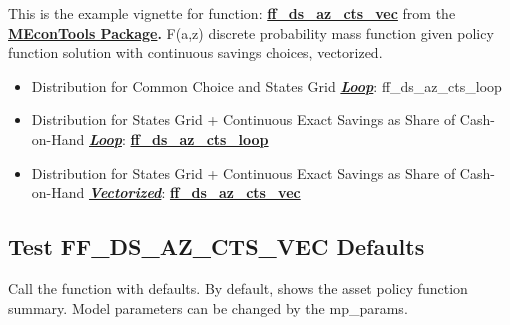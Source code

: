 \documentclass[
]{book}
\begin{document}
This is the example vignette for function:
\href{https://github.com/FanWangEcon/MEconTools/blob/master/MEconTools/vfi/ff_ds_az_cts_vec.m}{\textbf{ff\_ds\_az\_cts\_vec}}
from the \href{https://fanwangecon.github.io/MEconTools/}{\textbf{MEconTools
Package}}\textbf{.} F(a,z)
discrete probability mass function given policy function solution with
continuous savings choices, vectorized.

\begin{itemize}
\item
  Distribution for Common Choice and States Grid \underline{\textbf{\emph{Loop}}}:
  ff\_ds\_az\_cts\_loop
\item
  Distribution for States Grid + Continuous Exact Savings as Share of
  Cash-on-Hand \underline{\textbf{\emph{Loop}}}:
  \href{https://github.com/FanWangEcon/MEconTools/blob/master/MEconTools/vfi/ff_ds_az_cts_loop.m}{\textbf{ff\_ds\_az\_cts\_loop}}
\item
  Distribution for States Grid + Continuous Exact Savings as Share of
  Cash-on-Hand \underline{\textbf{\emph{Vectorized}}}:
  \href{https://github.com/FanWangEcon/MEconTools/blob/master/MEconTools/vfi/ff_ds_az_cts_vec.m}{\textbf{ff\_ds\_az\_cts\_vec}}
\end{itemize}

\hypertarget{test-ff_ds_az_cts_vec-defaults}{%
\subsection{Test FF\_DS\_AZ\_CTS\_VEC Defaults}\label{test-ff_ds_az_cts_vec-defaults}}

Call the function with defaults. By default, shows the asset policy
function summary. Model parameters can be changed by the mp\_params.
\end{document}
